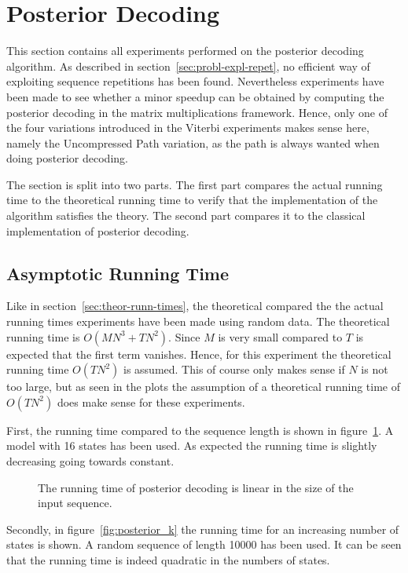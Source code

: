 \section{Posterior Decoding}

This section contains all experiments performed on the posterior decoding
algorithm. As described in section~\ref{sec:probl-expl-repet}, no efficient way
of exploiting sequence repetitions has been found. Nevertheless experiments
have been made to see whether a minor speedup can be obtained by computing the
posterior decoding in the matrix multiplications framework. Hence, only one of
the four variations introduced in the Viterbi experiments makes sense here,
namely the Uncompressed Path variation, as the path is always wanted when doing
posterior decoding.

The section is split into two parts. The first part compares the actual
running time to the theoretical running time to verify that the implementation
of the algorithm satisfies the theory. The second part compares it to the
classical implementation of posterior decoding.

\subsection{Asymptotic Running Time}

Like in section~\ref{sec:theor-runn-times}, the theoretical compared the the
actual running times experiments have been made using random data. The
theoretical running time is $O(M N^3 + TN^2)$. Since $M$ is very small compared
to $T$ is expected that the first term vanishes. Hence, for this experiment the
theoretical running time $O(TN^2)$ is assumed. This of course only makes sense
if $N$ is not too large, but as seen in the plots the assumption of a
theoretical running time of $O(TN^2)$ does make sense for these experiments.

First, the running time compared to the sequence length is shown in
figure~\ref{fig:posterior_n}. A model with 16 states has been used. As expected
the running time is slightly decreasing going towards constant.

\begin{figure}
  \centering
  
  \caption{The running time of posterior decoding is linear in the size of the
    input sequence.}
  \label{fig:posterior_n}
\end{figure}

Secondly, in figure~\ref{fig:posterior_k} the running time for an increasing
number of states is shown. A random sequence of length 10000 has been used. It
can be seen that the running time is indeed quadratic in the numbers of states.

